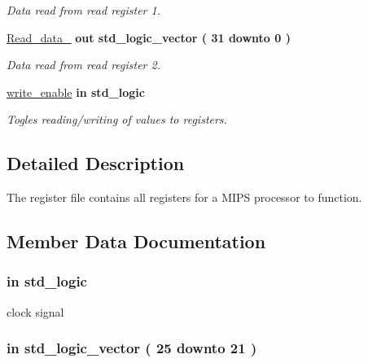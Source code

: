 \begin{DoxyCompactItemize}
\begin{DoxyCompactList}\small\item\em \-Data read from read register 1. \end{DoxyCompactList}\item 
\hyperlink{classregister__file_af0a7789b9c8f26a47416d35994c4a904}{\-Read\-\_\-data\-\_}  {\bfseries {\bfseries out }} {\bfseries std\-\_\-logic\-\_\-vector (   31    downto    0  ) } 
\begin{DoxyCompactList}\small\item\em \-Data read from read register 2. \end{DoxyCompactList}\item 
\hyperlink{classregister__file_ad8219ae15bef1c8943970162a36feced}{write\-\_\-enable}  {\bfseries {\bfseries in }} {\bfseries std\-\_\-logic } 
\begin{DoxyCompactList}\small\item\em \-Togles reading/writing of values to registers. \end{DoxyCompactList}\end{DoxyCompactItemize}


\subsection{\-Detailed \-Description}
\-The register file contains all registers for a \-M\-I\-P\-S processor to function. 

\subsection{\-Member \-Data \-Documentation}
\hypertarget{classregister__file_ae5e9fe74cd98136dd9bfe9fe944036a6}{
\subsubsection[{clk}]{ {\bfseries in } {\bfseries std\-\_\-logic } }}\label{classregister__file_ae5e9fe74cd98136dd9bfe9fe944036a6}


clock signal 

\hypertarget{classregister__file_a5ed2152c539c2ceb0607980c27b3b855}{
\subsubsection[{\-Read\-\_\-reg\-\_\-1}]{ {\bfseries in } {\bfseries std\-\_\-logic\-\_\-vector (   25    downto    21  ) } }}\label{classregister__file_a5ed2152c539c2ceb0607980c27b3b855}


